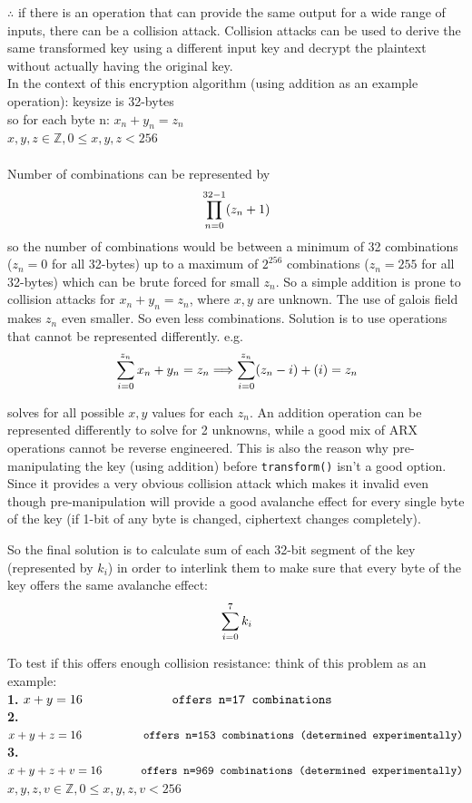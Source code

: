 \documentclass[fleqn, a4paper,12pt]{article}
\begin{document}
$\therefore$ if there is an operation that can provide the same output for a wide range of inputs, there can be a collision attack. Collision attacks can be used to derive the same transformed key using a different input key and decrypt the plaintext without actually having the original key.
\\
In the context of this encryption algorithm (using addition as an example operation): keysize is 32-bytes
\\
so for each byte n: $x_n + y_n = z_n$\\
$ x,y,z \in \mathbb{Z}, 0 \leq x,y,z < 256$\\
\\
Number of combinations can be represented by 
\[
\\		\prod_{n=0}^{32-1}(z_n+1)
\]
\small so the number of combinations would be between a minimum of 32 combinations ($z_n=0$ for all 32-bytes) up to a maximum of $2^{256}$ combinations ($z_n = 255$ for all 32-bytes) which can be brute forced for small $z_n$. So a simple addition is prone to collision attacks for $x_n+y_n=z_n$, where $x,y$ are unknown. The use of galois field makes $z_n$ even smaller. So even less combinations. Solution is to use operations that cannot be represented differently. e.g.
\[
\\\sum_{i=0}^{z_n} x_n + y_n = z_n \Longrightarrow
\sum_{i=0}^{z_n} (z_n-i)+(i) = z_n
\]

solves for all possible $x, y$ values for each $z_n$. An addition operation can be represented differently to solve for 2 unknowns, while a good mix of ARX operations cannot be reverse engineered. This is also the reason why pre-manipulating the key (using addition) before \texttt{transform()} isn't a good option. Since it provides a very obvious collision attack which makes it invalid even though pre-manipulation will provide a good avalanche effect for every single byte of the key (if 1-bit of any byte is changed, ciphertext changes completely).

So the final solution is to calculate sum of each 32-bit segment of the key (represented by $k_i$) in order to interlink them to make sure that every byte of the key offers the same avalanche effect:
\[
\\\sum_{i=0}^{7} k_i
\]

To test if this offers enough collision resistance: think of this problem as an example:
\\
\textbf{1.} $x+y=16 \texttt{\hspace{2.3cm} offers n=17 combinations}$\\
\textbf{2.} $x+y+z=16 \texttt{\hspace{1.7cm} offers n=153 combinations (determined experimentally)}$\\
\textbf{3.} $x+y+z+v=16 \texttt{\hspace{1cm} offers n=969 combinations (determined experimentally)}$\\
$x,y,z,v \in \mathbb{Z}, 0 \leq x,y,z,v < 256$\\
\end{document}
